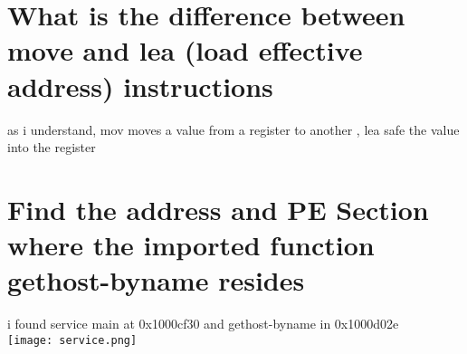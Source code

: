 \documentclass[10pt,a4paper]{article} %
\begin{document}
    \section{What is the difference between move and lea (load effective
    address) instructions}

        as i understand, mov moves a value from a register to another ,
        lea safe the value into the register


    \section{  Find the address and PE Section where the imported function gethost-byname resides }
        i found service main at 0x1000cf30  and gethost-byname in 0x1000d02e
        \\
        \texttt{[image: service.png]}
        \\




















































    \nocite{*}
    
    
\end{document}
